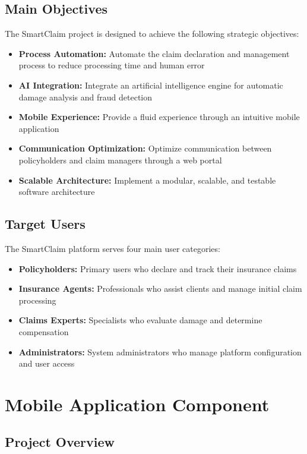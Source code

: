 \documentclass[12pt,a4paper]{report}
\begin{document}
\subsection{Main Objectives}

The SmartClaim project is designed to achieve the following strategic objectives:

\begin{itemize}
    \item \textbf{Process Automation:} Automate the claim declaration and management process to reduce processing time and human error
    \item \textbf{AI Integration:} Integrate an artificial intelligence engine for automatic damage analysis and fraud detection
    \item \textbf{Mobile Experience:} Provide a fluid experience through an intuitive mobile application
    \item \textbf{Communication Optimization:} Optimize communication between policyholders and claim managers through a web portal
    \item \textbf{Scalable Architecture:} Implement a modular, scalable, and testable software architecture
\end{itemize}

\subsection{Target Users}

The SmartClaim platform serves four main user categories:

\begin{itemize}
    \item \textbf{Policyholders:} Primary users who declare and track their insurance claims
    \item \textbf{Insurance Agents:} Professionals who assist clients and manage initial claim processing
    \item \textbf{Claims Experts:} Specialists who evaluate damage and determine compensation
    \item \textbf{Administrators:} System administrators who manage platform configuration and user access
\end{itemize}

\section{Mobile Application Component}

\subsection{Project Overview}
\end{document}
